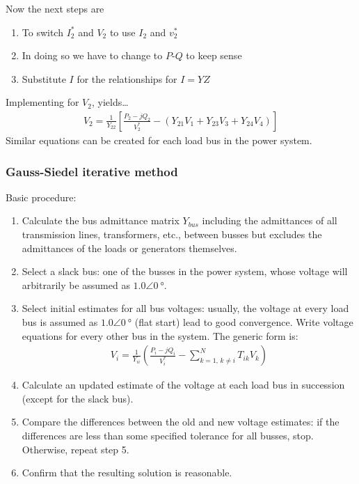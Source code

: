 Now the next steps are
\begin{enumerate}
	\item To switch $I^*_2$ and $V_2$ to use $I_2$ and $v_2^*$
	\item In doing so we have to change to $P$-$Q$ to keep sense
	\item Substitute $I$ for the relationships for $I = YZ$
\end{enumerate}
Implementing for $V_2$, yields\dots
\begin{gather}
	V_2 = \frac{1}{Y_{22}}\left[\frac{P_2-jQ_2}{V_2^*}-\left(Y_{21}V_1+Y_{23}V_3+Y_{24}V_4\right)\right]
\end{gather}
Similar equations can be created for each load bus in the power system.
\subsubsection{Gauss-Siedel iterative method}
Basic procedure:
\begin{enumerate}
	\item Calculate the bus admittance matrix $Y_{bus}$ including the admittances of all transmission lines, transformers, etc., between busses but excludes the admittances of the loads or generators themselves.
	\item Select a slack bus: one of the busses in the power system, whose voltage will arbitrarily be assumed as $1.0\angle\SI{0}{\degree}$.
	\item Select initial estimates for all bus voltages: usually, the voltage at every load bus is assumed as $1.0\angle\SI{0}{\degree}$ (flat start) lead to good convergence. Write voltage equations for every other bus in the system. The generic form is:
	      \begin{gather}
		      V_i = \frac{1}{Y_{ii}}\left(\frac{P_i-jQ_i}{V_i^*}-\sum^N_{k=1,\,k\neq i}T_{ik}V_k\right)
	      \end{gather}
	\item Calculate an updated estimate of the voltage at each load bus in succession (except for the slack bus).
	\item Compare the differences between the old and new voltage estimates: if the differences are less than some specified tolerance for all busses, stop. Otherwise, repeat step 5.
	\item Confirm that the resulting solution is reasonable.
\end{enumerate}
